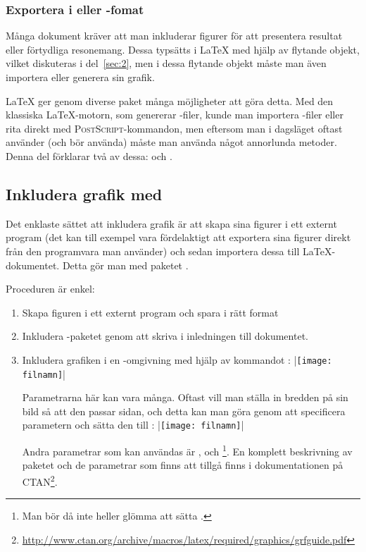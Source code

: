 \documentclass[../../latex.tex]{subfiles}
\begin{document}
\subsubsection{Exportera i \PDF eller \PNG-fomat}

\iffalse
Många dokument kräver att man inkluderar figurer för att presentera
resultat eller förtydliga resonemang. Dessa typsätts i \LaTeX{} med hjälp
av flytande objekt, vilket diskuteras i del~\ref{sec:2}, men i dessa
flytande objekt måste man även importera eller generera sin grafik.

\LaTeX{} ger genom diverse paket många möjligheter att göra detta. Med den
klassiska \LaTeX{}-motorn, som genererar \DVI-filer, kunde man importera
\EPS-filer eller rita direkt med \textsc{PostScript}-kommandon, men
eftersom man i dagsläget oftast använder (och bör använda) \pdfLaTeX{}
måste man använda något annorlunda metoder. Denna del förklarar två av
dessa:  och \PGFTikZ.

\subsection{Inkludera grafik med }
Det enklaste sättet att inkludera grafik är att skapa sina figurer i ett
externt program (det kan till exempel vara fördelaktigt att exportera sina
figurer direkt från den programvara man använder) och sedan importera
dessa till \LaTeX{}-dokumentet. Detta gör man med paketet .

Proceduren är enkel:
\begin{enumerate}
	\item Skapa figuren i ett externt program och spara i rätt format
	
	\item Inkludera -paketet genom att skriva
	 i inledningen till dokumentet.
	
	\item Inkludera grafiken i en -omgivning med hjälp av
	kommandot :
	\latex|\texttt{[image: filnamn]}|
	
	Parametrarna här kan vara många. Oftast vill man ställa in bredden på
	sin bild så att den passar sidan, och detta kan man göra genom att
	specificera parametern  och sätta den till
	:
	\latex|\texttt{[image: filnamn]}|
	
	Andra parametrar som kan användas är , 
	och \footnote{Man bör då inte heller glömma att sätta
	.\hfil}. En komplett beskrivning av paketet och de 
	parametrar som finns att tillgå finns i dokumentationen på
	CTAN\footnote{\url{http://www.ctan.org/archive/macros/latex/required/graphics/grfguide.pdf}}.
\end{enumerate}
\end{document}
